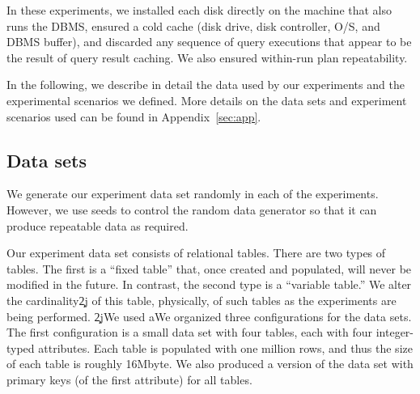 \documentclass[prodmode,acmtods]{acmsmall}
\begin{document}

In these experiments, we  installed each disk directly
on the machine that also runs the DBMS, ensured a cold cache (disk drive,
disk controller, O/S, and DBMS buffer), and discarded any sequence of query
executions that appear to be the result of query result caching. We also
ensured within-run plan repeatability.

In the following, we describe in detail the data used by our experiments and
the experimental scenarios we defined. More details on the data sets and
experiment scenarios used
can be found in Appendix~\ref{sec:app}.

\subsection{Data sets}\label{sec:datasets}
We generate our experiment data set randomly in each of the experiments. However, we
use seeds to control the random data generator so that it can produce
repeatable data as required.

Our experiment data set consists of relational tables. There are two types of
tables. The first is a ``fixed table'' that, once created and
populated, will never be modified in the future.  In contrast, the second
type is a ``variable table.'' We alter the cardinality\c2j{ of
  this table}{, physically, of such tables} as the experiments are being performed. 
\c2j{We used a}{We organized three configurations for the data sets. The first configuration
is a small} data set with four tables, each with four integer-typed
attributes. Each table is populated with one million rows, and thus the size
of each table is roughly 16Mbyte. We also produced a version of the data set with primary
keys (of the first attribute) for all tables.
\end{document}
